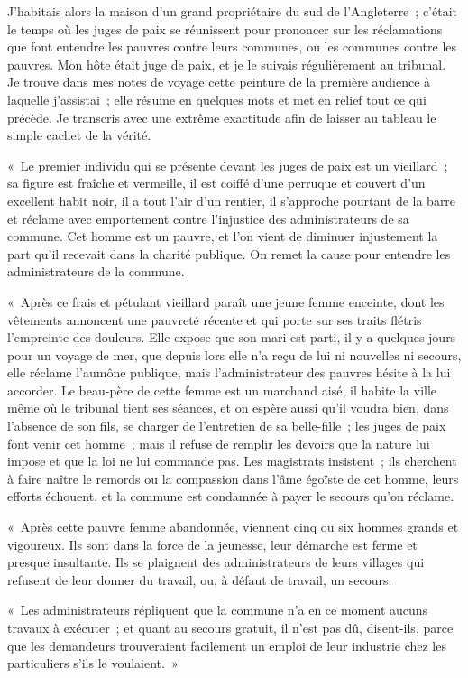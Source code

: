 \documentclass[french,twoside]{book} %
\newenvironment{quoteblock}%
  {\begin{quoting}}
  {\end{quoting}}
\newenvironment{quotebar}{%
    \def\FrameCommand{{\color{rubric!10!}\vrule width 0.5em} \hspace{0.9em}}%
    \def\OuterFrameSep{\itemsep} %
    \MakeFramed {\advance\hsize-\width \FrameRestore}
  }%
  {%
    \endMakeFramed
  }
\renewenvironment{quoteblock}%
  {%
    \savenotes
    \setstretch{0.9}
    \normalfont
    \begin{quotebar}
  }
  {%
    \end{quotebar}
    \spewnotes
  }
\begin{document}
J'habitais alors la maison d’un grand propriétaire du sud de l’Angleterre ; c’était le temps où les juges de paix se réunissent pour prononcer sur les réclamations que font entendre les pauvres contre leurs communes, ou les communes contre les pauvres. Mon hôte était juge de paix, et je le suivais régulièrement au tribunal. Je trouve dans mes notes de voyage cette peinture de la première audience à laquelle j’assistai ; elle résume en quelques mots et met en relief tout ce qui précède. Je transcris avec une extrême exactitude afin de laisser au tableau le simple cachet de la vérité.\par

\begin{quoteblock}
 \noindent « Le premier individu qui se présente devant les juges de paix est un vieillard ; sa figure est fraîche et vermeille, il est coiffé d’une perruque et couvert d’un excellent habit noir, il a tout l’air d’un rentier, il s’approche pourtant de la barre et réclame avec emportement contre l’injustice des administrateurs de sa commune. Cet homme est un pauvre, et l’on vient de diminuer injustement la part qu’il recevait dans la charité publique. On remet la cause pour entendre les administrateurs de la commune.\par
 « Après ce frais et pétulant vieillard paraît une jeune femme enceinte, dont les vêtements annoncent une pauvreté récente et qui porte sur ses traits flétris l’empreinte des douleurs. Elle expose que son mari est parti, il y a quelques jours pour un voyage de mer, que depuis lors elle n’a reçu de lui ni nouvelles ni secours, elle réclame l’aumône publique, mais l’administrateur des pauvres hésite à la lui accorder. Le beau-père de cette femme est un marchand aisé, il habite la ville même où le tribunal tient ses séances, et on espère aussi qu’il voudra bien, dans l’absence de son fils, se charger de l’entretien de sa belle-fille ; les juges de paix font venir cet homme ; mais il refuse de remplir les devoirs que la nature lui impose et que la loi ne lui commande pas. Les magistrats insistent ; ils cherchent à faire naître le remords ou la compassion dans l’âme égoïste de cet homme, leurs efforts échouent, et la commune est condamnée à payer le secours qu’on réclame.\par
 « Après cette pauvre femme abandonnée, viennent cinq ou six hommes grands et vigoureux. Ils sont dans la force de la jeunesse, leur démarche est ferme et presque insultante. Ils se plaignent des administrateurs de leurs villages qui refusent de leur donner du travail, ou, à défaut de travail, un secours.\par
 « Les administrateurs répliquent que la commune n’a en ce moment aucuns travaux à exécuter ; et quant au secours gratuit, il n’est pas dû, disent-ils, parce que les demandeurs trouveraient facilement un emploi de leur industrie chez les particuliers s’ils le voulaient. »
 \end{quoteblock}
\end{document}
